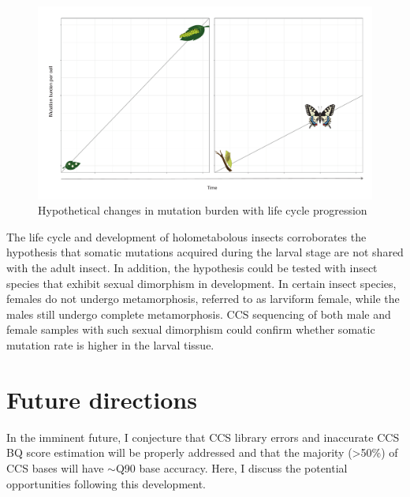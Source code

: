 \begin{figure}[h!]
\caption{Hypothetical changes in mutation burden with life cycle progression}
\label{figure:lepidoptera-mutation-burden}
\begin{centering}
\includegraphics[width=\textwidth]{lepidoptera_mutation_burden.pdf} 
\end{centering}
\end{figure}

The life cycle and development of holometabolous insects corroborates the hypothesis that somatic mutations acquired during the larval stage are not shared with the adult insect. In addition, the hypothesis could be tested with insect species that exhibit sexual dimorphism in development. In certain insect species, females do not undergo metamorphosis, referred to as larviform female, while the males still undergo complete metamorphosis. CCS sequencing of both male and female samples with such sexual dimorphism could confirm whether somatic mutation rate is higher in the larval tissue.

\section{Future directions}

In the imminent future, I conjecture that CCS library errors and inaccurate CCS BQ score estimation will be properly addressed and that the majority (>50\%) of CCS bases will have $\sim$Q90 base accuracy. Here, I discuss the potential opportunities following this development.

